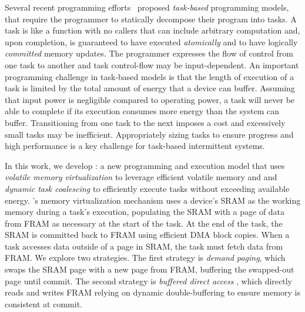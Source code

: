 
Several recent programming efforts~\cite{alpaca,chain} proposed {\em
task-based} programming models, that require the programmer to statically
decompose their program into tasks. A task is like a function with no callers
that can include arbitrary computation and, upon completion, is guaranteed to
have executed {\em atomically} and to have logically {\em committed} memory
updates. The programmer expresses the flow of control from one task to another
and task control-flow may be input-dependent. An important programming
challenge in task-based models is that the length of execution of a task is
limited by the total amount of energy that a device can buffer. Assuming that
input power is negligible compared to operating power, a task will never be
able to complete if its execution consumes more energy than the system can
buffer. Transitioning from one task to the next imposes a cost and excessively
small tasks may be inefficient. Appropriately sizing tasks to ensure progress
and high performance is a key challenge for task-based intermittent systems. 

In this work, we develop \sys: a new programming and execution model that uses
{\em volatile memory virtualization} to leverage efficient volatile memory and
and {\em dynamic task coalescing} to efficiently execute tasks without
exceeding available energy. \sys's memory virtualization mechanism uses a
device's SRAM as the working memory during a task's execution, populating the
SRAM with a page of data from FRAM as necessary at the start of the task. At
the end of the task, the SRAM is committed back to FRAM using efficient DMA
block copies.  When a task accesses data outside of a page in SRAM,
the task must fetch data from FRAM. We explore two strategies. The first
strategy is {\em demand paging}, which swaps the SRAM page with a new page from
FRAM, buffering the swapped-out page until commit. The second strategy is {\em
buffered direct access} , which directly reads and writes
FRAM relying on dynamic double-buffering to ensure memory is consistent at
commit.


